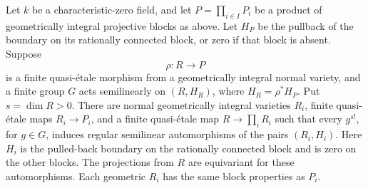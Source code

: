 \begin{proposition}
\label{prop:semilinear}
Let $k$ be a characteristic-zero field, and let
$P=\prod_{i\in I}P_i$ be a product of geometrically integral
projective blocks as above.  Let $H_P$ be the pullback of the
boundary on its rationally connected block, or zero if that block
is absent.  Suppose
\[
                         \rho:R\longrightarrow P
\]
is a finite quasi-\'etale morphism from a geometrically integral
normal variety, and a finite group $G$ acts semilinearly on
$(R,H_R)$, where $H_R=\rho^*H_P$.  Put $s=\dim R>0$.
There are normal geometrically integral varieties $R_i$, finite
quasi-\'etale maps $R_i\to P_i$, and a finite quasi-\'etale map
$R\to\prod_iR_i$ such that every $g^{s!}$, for $g\in G$, induces
regular semilinear automorphisms of the pairs $(R_i,H_i)$.
Here $H_i$ is the pulled-back boundary on the rationally connected
block and is zero on the other blocks.  The projections from $R$
are equivariant for these automorphisms.  Each geometric $R_i$
has the same block properties as $P_i$.
\end{proposition}

